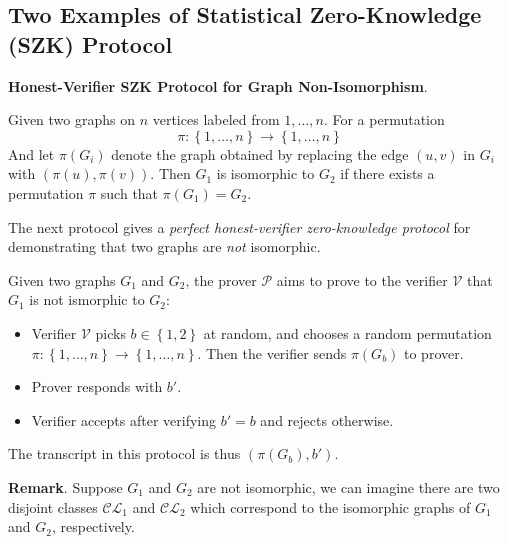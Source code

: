 \documentclass{article}
\begin{document}
\subsection{Two Examples of Statistical Zero-Knowledge (SZK) Protocol}

\textbf{Honest-Verifier SZK Protocol for Graph Non-Isomorphism}. 

\begin{boxx1}
Given two graphs on $n$ vertices labeled from $1, \dots, n$. For a permutation 
\begin{equation*}
\pi: \left\{ 1, \dots, n \right\} \rightarrow \left\{ 1, \dots, n \right\}
\end{equation*}
And let $\pi(G_i)$ denote the graph obtained by replacing the edge $(u, v)$ in $G_i$ with $(\pi(u), \pi(v))$. Then $G_1$ is isomorphic to $G_2$ if there exists a permutation $\pi$ such that $\pi(G_1) = G_2$. 
\end{boxx1}

The next protocol gives a \textit{perfect honest-verifier zero-knowledge protocol} for demonstrating that two graphs are \textit{not} isomorphic. 

\begin{boxx1}
Given two graphs $G_1$ and $G_2$, the prover $\mathcal{P}$ aims to prove to the verifier $\mathcal{V}$ that $G_1$ is not ismorphic to $G_2$:
\begin{itemize}
\item Verifier $\mathcal{V}$ picks $b \in \left\{ 1, 2 \right\}$ at random, and chooses a random permutation $\pi: \left\{ 1, \dots, n \right\} \rightarrow \left\{ 1, \dots, n \right\}$. Then the verifier sends $\pi(G_b)$ to prover. 
\item Prover responds with $b'$. 
\item Verifier accepts after verifying $b' = b$ and rejects otherwise. 
\end{itemize}
The transcript in this protocol is thus $\left( \pi(G_b), b' \right)$.
\end{boxx1}

\textbf{Remark}. Suppose $G_1$ and $G_2$ are not isomorphic, we can imagine there are two disjoint classes $\mathcal{CL}_1$ and $\mathcal{CL}_2$ which correspond to the isomorphic graphs of $G_1$ and $G_2$, respectively.
\end{document}
